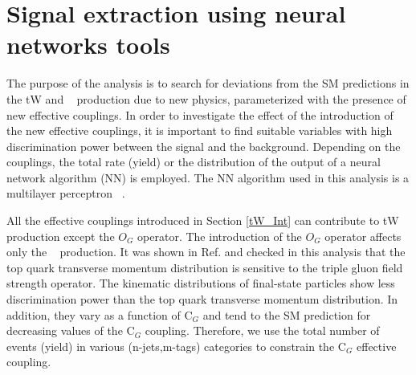 \clearpage
\section{Signal extraction using neural networks tools}
\label{signal}
The purpose of the analysis is to search for deviations from the SM predictions in the tW and \ttbar~ production due to new physics, parameterized with the presence of new effective couplings. In order to investigate the effect of the introduction of the new effective couplings,
it is important to find suitable variables with high discrimination power between the signal and the  background.
Depending on the couplings, the total rate (yield) or the distribution of the output of a neural network algorithm (NN) is employed.
The NN algorithm used in this analysis is a multilayer perceptron ~\cite{Denby:1992jd}.


All the effective couplings introduced in Section \ref{tW_Int} can contribute to  tW production except the $O_{G}$ operator.
The introduction of the $O_{G}$ operator affects only the \ttbar~ production. It was shown in Ref. \cite{Cho:1994yu} and checked in this analysis that the top quark transverse momentum distribution is sensitive to the triple gluon field strength operator.
The kinematic distributions of final-state particles show less discrimination power than the  top quark transverse momentum distribution. In addition,  they vary as a function of C$_{G}$ and tend to the SM prediction for decreasing values of the C$_{G}$ coupling. Therefore, we use the total number of events (yield) in  various (n-jets,m-tags) categories to constrain the C$_G$ effective coupling.

